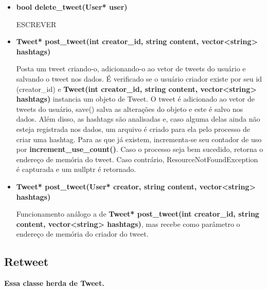 \documentclass[a4paper]{article}
\begin{document}
\begin{itemize}
    \item \textbf{bool delete\_tweet(User* user)}

    ESCREVER

    \item \textbf{Tweet* post\_tweet(int creator\_id, string content, vector<string> hashtags)}

    Posta um tweet criando-o, adicionando-o ao vetor de tweets do usuário
    e salvando o tweet nos dados. É verificado se o usuário criador existe por seu id (creator\_id) e \textbf{Tweet(int creator\_id, string content, vector<string> hashtags)} instancia um objeto de Tweet. O tweet é adicionado ao vetor de tweets do usuário, save() salva as alterações do objeto e este é salvo nos dados. Além disso, as hashtags são analisadas e, caso alguma delas ainda não esteja registrada nos dados, um arquivo é criado para ela pelo processo de criar uma hashtag. Para as que já existem, incrementa-se seu contador de uso por \textbf{increment\_use\_count()}. Caso o processo seja bem sucedido, retorna o endereço de memória do tweet. Caso contrário, ResourceNotFoundException é capturada e um nullptr é retornado.

    \item \textbf{Tweet* post\_tweet(User* creator, string content, vector<string> hashtags)}

    Funcionamento análogo a de \textbf{Tweet* post\_tweet(int creator\_id, string content, vector<string> hashtags)}, mas recebe como parâmetro o endereço de memória do criador do tweet.

\end{itemize}

\subsection{Retweet}
\textbf{Essa classe herda de Tweet.}
\end{document}
